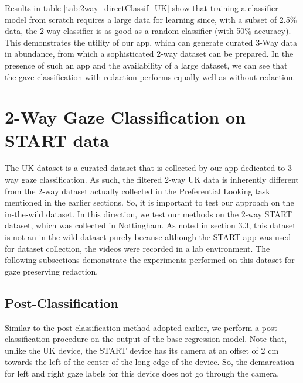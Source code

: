 Results in table \ref{tab:2way_directClassif_UK} show that training a classifier model from scratch requires a large data for learning since, with a subset of 2.5\% data, the 2-way classifier is as good as a random classifier (with 50\% accuracy). This demonstrates the utility of our app, which can generate curated 3-Way data in abundance, from which a sophisticated 2-way dataset can be prepared. In the presence of such an app and the availability of a large dataset, we can see that the gaze classification with redaction performs equally well as without redaction.


\section{2-Way Gaze Classification on START data}
The UK dataset is a curated dataset that is collected by our app dedicated to 3-way gaze classification. As such, the filtered 2-way UK data is inherently different from the 2-way dataset actually collected in the Preferential Looking task mentioned in the earlier sections. So, it is important to test our approach on the in-the-wild dataset. In this direction, we test our methods on the 2-way START dataset, which was collected in Nottingham. As noted in section 3.3, this dataset is not an in-the-wild dataset purely because although the START app was used for dataset collection, the videos were recorded in a lab environment. The following subsections demonstrate the experiments performed on this dataset for gaze preserving redaction.


\subsection{Post-Classification}
Similar to the post-classification method adopted earlier, we perform a post-classification procedure on the output of the base regression model. Note that, unlike the UK device, the START device has its camera at an offset of 2 cm towards the left of the center of the long edge of the device. So, the demarcation for left and right gaze labels for this device does not go through the camera.

